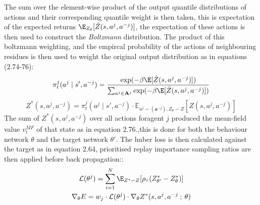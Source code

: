 The sum over the element-wise product of the output quantile distributions of actions and their
corresponding quantile weight is then taken, this is expectation of the expected returns
$\E_{Z_{\theta}}[\hat{Z}(s,a^j, a^{-j})]$, the expectation of these actions is then used to construct the 
\emph{Boltzmann} distribution.
The product of this boltzmann weighting, and the empircal probability of the actions
of neighbouring residues is then used to weight the original output distribution as in 
equations (2.74-76):
\begin{equation}
    \pi^j_t(a^j \mid s',a^{-j}) = \frac{\exp(- \beta \E[\hat{Z}(s,a^j, a^{-j})])}{\sum_{a^j \in \mathbf{A}^j} \exp(- \beta \E[\hat{Z}(s,a^j, a^{-j})])}
\end{equation}
\begin{equation}
    Z^*(s,a^j, a^{-j}) = \pi^j_t(a^j \mid s',a^{-j}) \cdot \mathbb{E}_{a^j \backsim(\mathbf{a}^{-j}), Z_\theta \backsim Z}[\hat{Z}(s,a^j, a^{-j})]
\end{equation}
The sum of $Z^*(s,a^j, a^{-j})$ over all actions foragent $j$ produced the mean-field value $v^{MF}_t$ of that state as 
in equation 2.76.,this is done for both the behaviour network $\theta$ and the target network $\theta'$.
The huber loss is then calculated against the target as in equation 2.64,
prioritised replay importance sampling ratios are then applied before back propagation::
\begin{equation}
    \begin{gathered}
        \mathcal{L}(\theta^j) = \sum^N_{i=1} \E_{Z^* \backsim Z}[\rho_{\tau}(Z^*_{\theta'} - Z^*_{\theta})] \\
    \nabla_\theta E = w_j \cdot \mathcal{L}(\theta^j) \cdot \nabla_\theta Z^*(s,a^j, a^{-j}\: ; \: \theta)
    \end{gathered}
\end{equation}